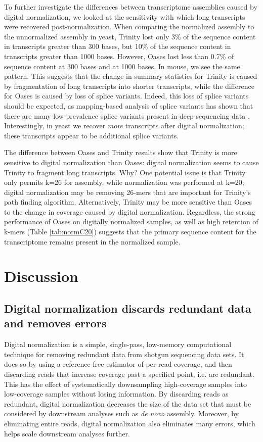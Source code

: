 \documentclass[10pt]{article}
\begin{document}
To further investigate the differences between transcriptome
assemblies caused by digital normalization, we looked at the
sensitivity with which long transcripts were recovered
post-normalization.  When comparing the normalized assembly to the
unnormalized assembly in yeast, Trinity lost only 3\% of the sequence
content in transcripts greater than 300 bases, but 10\% of the
sequence content in transcripts greater than 1000 bases.  However,
Oases lost less than 0.7\% of sequence content at 300 bases and at
1000 bases.  In mouse, we see the same pattern.
This suggests that the change in summary statistics for
Trinity is caused by fragmentation of long transcripts into shorter
transcripts, while the difference for Oases is caused by loss of
splice variants.  Indeed, this
loss of splice variants should be expected, as mapping-based analysis
of splice variants has shown that there are many low-prevalence splice
variants present in deep sequencing data \cite{pubmed21151575}.
Interestingly, in yeast we recover {\em more} transcripts after
digital normalization; these transcripts appear to be additional splice
variants.


The difference between Oases and Trinity results show that Trinity is
more sensitive to digital normalization than Oases: digital
normalization seems to cause Trinity to fragment long transcripts.
Why?  One potential issue is that Trinity only permits k=26 for
assembly, while normalization was performed at k=20; digital
normalization may be removing 26-mers that are important for Trinity's
path finding algorithm.  Alternatively, Trinity may be more sensitive
than Oases to the change in coverage caused by digital normalization.
Regardless, the strong performance of Oases on digitally normalized
samples, as well as high retention of k-mers (Table \ref{tab:normC20})
suggests that the primary sequence content for the transcriptome remains
present in the normalized sample.

\section*{Discussion}

\subsection*{Digital normalization discards redundant data and removes errors}

Digital normalization is a simple, single-pass, low-memory
computational technique for removing redundant data from shotgun
sequencing data sets.  It does so by using a reference-free estimator
of per-read coverage, and then discarding reads that increase coverage
past a specified point, i.e. are redundant.  This has the effect of
systematically downsampling high-coverage samples into low-coverage
samples without losing information.  By discarding reads as redundant,
digital normalization decreases the size of the data set that must be
considered by downstream analyses such as {\em de novo} assembly.
Moreover, by eliminating entire reads, digital normalization also
eliminates many errors, which helps scale downstream analyses further.
\end{document}
